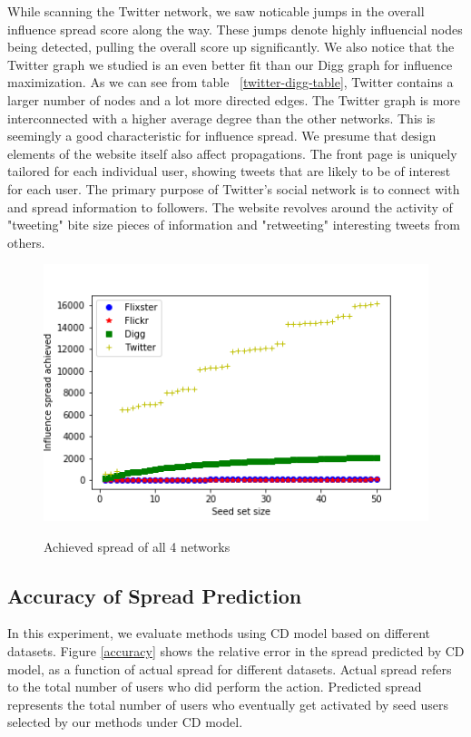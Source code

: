 \documentclass{acm_proc_article-sp}
\begin{document}
While scanning the Twitter network, we saw noticable jumps in the overall influence spread score along the way. These jumps denote highly influencial nodes being detected, pulling the overall score up significantly. We also notice that the Twitter graph we studied is an even better fit than our Digg graph for influence maximization. As we can see from table ~\ref{twitter-digg-table}, Twitter contains a larger number of nodes and a lot more directed edges. The Twitter graph is more  interconnected with a higher average degree than the other networks. This is seemingly a good characteristic for influence spread. We presume that design elements of the website itself also affect propagations. The front page is uniquely tailored for each individual user, showing tweets that are likely to be of interest for each user. The primary purpose of Twitter's social network is to connect with and spread information to followers. The website revolves around the activity of "tweeting" bite size pieces of information and "retweeting" interesting tweets from others.

\begin{figure}[h]
	\includegraphics[width=\linewidth]{spread4.png}
	\centering
	\label{spreadall}
    \caption{Achieved spread of all 4 networks}
\end{figure}

\subsection*{Accuracy of Spread Prediction}
In this experiment, we evaluate methods using CD model based on different datasets. Figure \ref{accuracy} shows the relative error in the spread predicted by CD model, as a function of actual spread for different datasets. Actual spread refers to the total number of users who did perform the action. Predicted spread represents the total number of users who eventually get activated by seed users selected by our methods under CD model.
\end{document}
